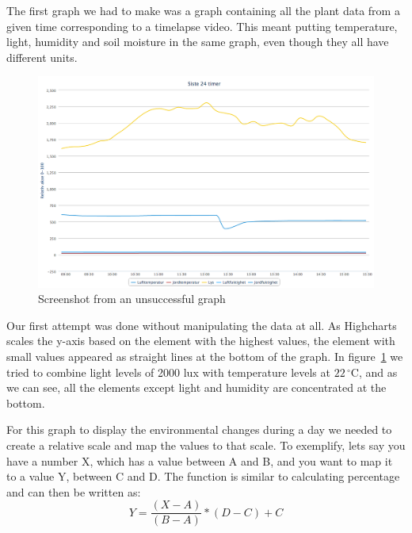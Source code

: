 The first graph we had to make was a graph containing all the plant data from a given time corresponding to a timelapse video. This meant putting temperature, light, humidity and soil moisture in the same graph, even though they all have different units. 



\begin{figure}
\centering
\includegraphics[width=1\textwidth]{img/interface/badgraph.png}
\caption{Screenshot from an unsuccessful graph}
\label{fig:badgraph}
\end{figure}

Our first attempt was done without manipulating the data at all. As Highcharts scales the y-axis based on the element with the highest values, the element with small values appeared as straight lines at the bottom of the graph. In figure~\ref{fig:badgraph} we tried to combine light levels of 2000 lux with temperature levels at $22\,^{\circ}\mathrm{C}$, and as we can see, all the elements except light and humidity are concentrated at the bottom. 

For this graph to display the environmental changes during a day we needed to create a relative scale and map the values to that scale. To exemplify, lets say you have a number X, which has a value between A and B, and you want to map it to a value Y, between C and D. The function is similar to calculating percentage and can then be written as: 
\begin{equation}
Y = \frac{(X-A)}{(B-A)} * (D-C) + C
\end{equation}


